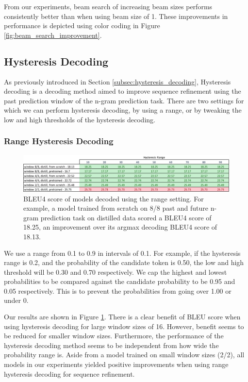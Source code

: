 From our experiments, beam search of increasing beam sizes performs consistently better than when using beam size of 1. These improvements in performance is depicted using color coding in Figure \ref{fig:beam_search_improvement}.

\subsection{Hysteresis Decoding} 
As previously introduced in Section \ref{subsec:hysteresis_decoding}, Hysteresis decoding is a decoding method aimed to improve sequence refinement using the past prediction window of the n-gram prediction task. There are two settings for which we can perform hysteresis decoding, by using a range, or by tweaking the low and high thresholds of the hysteresis decoding.


\subsubsection{Range Hysteresis Decoding} \label{subsubsec:range_hdec}

\begin{figure}[hpbt!]
    \centering
    \includegraphics[width=\textwidth]{images/chap04_images/hysteresis_decoding_range.pdf}
    \caption{BLEU4 score of models decoded using the range setting. For example, a model trained from scratch on 8/8 past and future n-gram prediction task on distilled data scored a BLEU4 score of 18.25, an improvement over its argmax decoding BLEU4 score of 18.13.}
    \label{fig:hysteresis_decoding_range}
\end{figure}

We use a range from 0.1 to 0.9 in intervals of 0.1. For example, if the hysteresis range is 0.2, and the probability of the candidate token is 0.50, the low and high threshold will be 0.30 and 0.70 respectively. We cap the highest and lowest probabilities to be compared against the candidate probability to be 0.95 and 0.05 respectively. This is to prevent the probabilities from going over 1.00 or under 0.


Our results are shown in Figure \ref{fig:hysteresis_decoding_range}. There is a clear benefit of BLEU score when using hysteresis decoding for large window sizes of 16. However, benefit seems to be reduced for smaller window sizes. Furthermore, the performance of the hysteresis decoding method seems to be independent from how wide the probability range is. Aside from a model trained on small window sizes (2/2), all models in our experiments yielded positive improvements when using range hysteresis decoding for sequence refinement.

